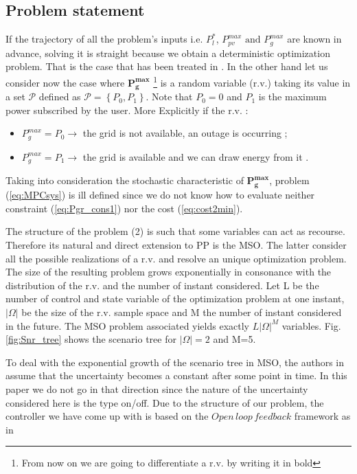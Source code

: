 \documentclass[conference]{IEEEtran}
\begin{document}
\subsection{Problem statement}
If the trajectory of all the problem's inputs i.e. $P_l^*$, $P_{pv}^{max}  \text{ and } P_g^{max}$ are known in advance, solving it is straight because we obtain a deterministic optimization problem. 
That is the case that has been treated in \cite{JPrPHa2019}. In the other hand let us consider now the case where $\textbf{P}_\textbf{g}^{\textbf{max}}$ \footnote{From now on we are going to differentiate  a r.v. by writing it in bold}  is a random variable (r.v.) taking its value in a set $\mathcal{P}$ defined as $ \mathcal{P} = \left \{ P_0 , P_1\right \}$. Note that $P_0=0$ and $P_1$ is the maximum power subscribed by the user. More Explicitly if the r.v. : \begin{itemize}
\item $P_g^{max} = P_0 \rightarrow$ the grid is not available, an outage is occurring ; 
\item $P_g^{max} = P_1 \rightarrow$ the grid is available and we can draw energy from it . 
\end{itemize}

Taking into consideration the stochastic characteristic of $\textbf{P}_\textbf{g}^{\textbf{max}}$, problem (\ref{eq:MPCsys}) is ill defined since we do not know how to evaluate  neither constraint (\ref{eq:Pgr_cons1}) nor the cost (\ref{eq:cost2min}).
 
 The structure of the problem (2) is such that some variables can act as recourse. Therefore its natural and direct extension to PP is the MSO. The latter consider all the possible realizations of a r.v. and resolve an unique optimization problem. The size of the resulting problem grows exponentially in consonance with the distribution of the r.v. and the number of instant considered. Let L be the number of control and state variable of the optimization problem at one instant, $|\Omega|$ be the size of the r.v. sample space and M the number of instant considered in the future. The MSO problem associated yields exactly  $L|\Omega|^M$ variables. Fig. \ref{fig:Snr_tree} shows   the scenario tree for $|\Omega|= 2$ and M=5. 
  
To deal with the exponential growth of the scenario tree in MSO, the authors in \cite{SLuAJo2014} assume that the uncertainty becomes a constant after some point in time.  In this paper we do not go in that direction since the nature of the uncertainty considered here is the type on/off. Due to the structure of our problem, the controller we have come up with is based on the $Open\, loop\, feedback$ framework as in \cite{YBarRSi1969} 
 
\end{document}

